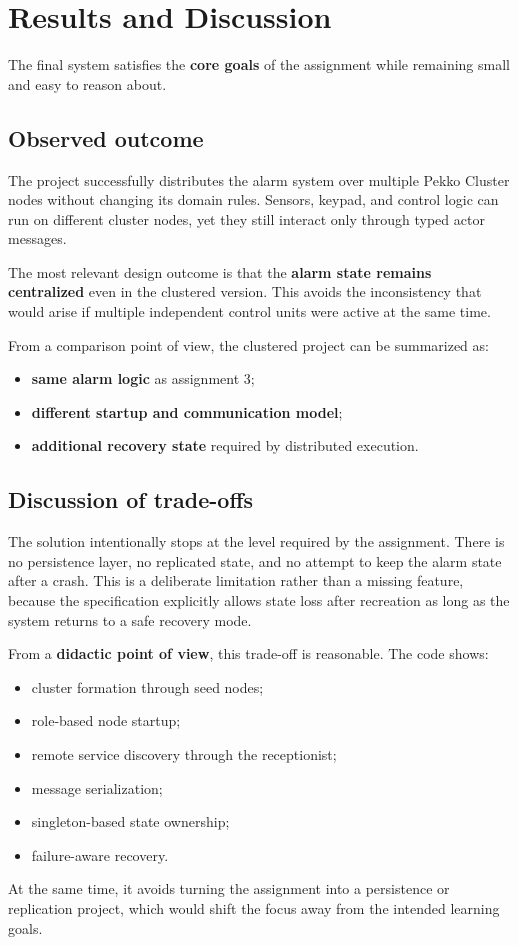\clearpage
\section{Results and Discussion}

The final system satisfies the \textbf{core goals} of the assignment while remaining
small and easy to reason about.

\subsection{Observed outcome}

The project successfully distributes the alarm system over multiple Pekko
Cluster nodes without changing its domain rules. Sensors, keypad, and control
logic can run on different cluster nodes, yet they still interact only through typed
actor messages.

The most relevant design outcome is that the \textbf{alarm state remains
centralized} even in the clustered version. This avoids the inconsistency that
would arise if multiple independent control units were active at the same
time.

From a comparison point of view, the clustered project can be summarized as:
\begin{itemize}
    \item \textbf{same alarm logic} as assignment 3;
    \item \textbf{different startup and communication model};
    \item \textbf{additional recovery state} required by distributed execution.
\end{itemize}

\subsection{Discussion of trade-offs}

The solution intentionally stops at the level required by the assignment.
There is no persistence layer, no replicated state, and no attempt to keep the
alarm state after a crash. This is a deliberate limitation rather than a
missing feature, because the specification explicitly allows state loss after
recreation as long as the system returns to a safe recovery mode.

From a \textbf{didactic point of view}, this trade-off is reasonable. The code shows:

\begin{itemize}
    \item cluster formation through seed nodes;
    \item role-based node startup;
    \item remote service discovery through the receptionist;
    \item message serialization;
    \item singleton-based state ownership;
    \item failure-aware recovery.
\end{itemize}

At the same time, it avoids turning the assignment into a persistence or
replication project, which would shift the focus away from the intended
learning goals.
